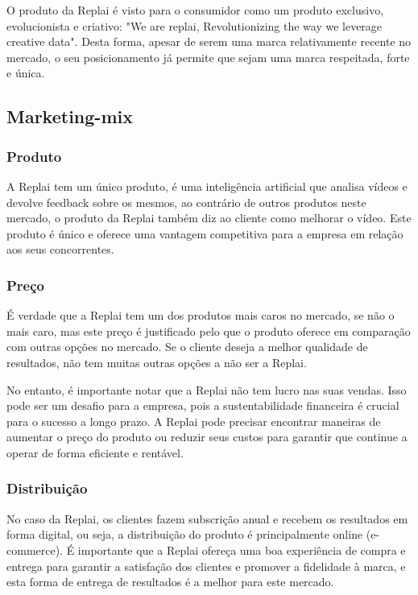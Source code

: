 O produto da Replai é visto para o consumidor como um produto exclusivo, evolucionista e criativo: "We are replai, Revolutionizing the way we leverage creative data". Desta forma, apesar de serem uma marca relativamente recente no mercado, o seu posicionamento já permite que sejam uma marca respeitada, forte e única. 

\subsection{Marketing-mix}

\subsubsection{Produto}

A Replai tem um único produto, é uma inteligência artificial que analisa vídeos e devolve feedback sobre os mesmos, ao contrário de outros produtos neste mercado, o produto da Replai também diz ao cliente como melhorar o vídeo. Este produto é único e oferece uma vantagem competitiva para a empresa em relação aos seus concorrentes.


\subsubsection{Preço}

 É verdade que a Replai tem um dos produtos mais caros no mercado, se não o mais caro, mas este preço é justificado pelo que o produto oferece em comparação com outras opções no mercado. Se o cliente deseja a melhor qualidade de resultados, não tem muitas outras opções a não ser a Replai.

No entanto, é importante notar que a Replai não tem lucro nas suas vendas. Isso pode ser um desafio para a empresa, pois a sustentabilidade financeira é crucial para o sucesso a longo prazo. A Replai pode precisar encontrar maneiras de aumentar o preço do produto ou reduzir seus custos para garantir que continue a operar de forma eficiente e rentável.

\subsubsection{Distribuição}

No caso da Replai, os clientes fazem subscrição anual e recebem os resultados em forma digital, ou seja, a distribuição do produto é principalmente online (e-commerce). É importante que a Replai ofereça uma boa experiência de compra e entrega para garantir a satisfação dos clientes e promover a fidelidade à marca, e esta forma de entrega de resultados é a melhor para este mercado.


